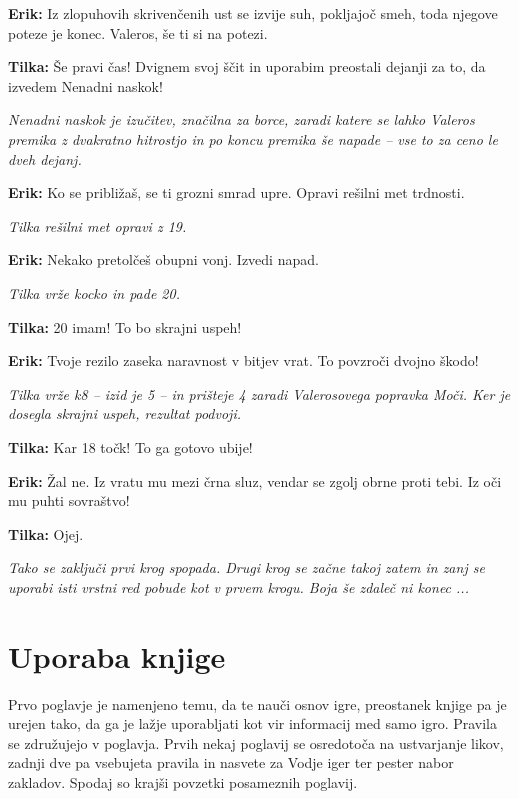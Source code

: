 \textbf{Erik:} Iz zlopuhovih skrivenčenih ust se izvije suh, pokljajoč smeh, toda njegove poteze je konec. Valeros, še ti si na potezi.

\textbf{Tilka:} Še pravi čas! Dvignem svoj ščit in uporabim preostali dejanji za to, da izvedem Nenadni naskok!

\vspace{20pt}
\textit{Nenadni naskok je izučitev, značilna za borce, zaradi katere se lahko Valeros premika z dvakratno hitrostjo in po koncu premika še napade -- vse to za ceno le dveh dejanj.}
\vspace{20pt}

\textbf{Erik:} Ko se približaš, se ti grozni smrad upre. Opravi rešilni met trdnosti.

\vspace{20pt}
\textit{Tilka rešilni met opravi z 19.}
\vspace{20pt}

\textbf{Erik:} Nekako pretolčeš obupni vonj. Izvedi napad.

\vspace{20pt}
\textit{Tilka vrže kocko in pade 20.}
\vspace{20pt}

\textbf{Tilka:} 20 imam! To bo skrajni uspeh!

\textbf{Erik:} Tvoje rezilo zaseka naravnost v bitjev vrat. To povzroči dvojno škodo!

\vspace{20pt}
\textit{Tilka vrže k8 -- izid je 5 -- in prišteje 4 zaradi Valerosovega popravka Moči. Ker je dosegla skrajni uspeh, rezultat podvoji.}
\vspace{20pt}

\textbf{Tilka:} Kar 18 točk! To ga gotovo ubije!

\textbf{Erik:} Žal ne. Iz vratu mu mezi črna sluz, vendar se zgolj obrne proti tebi. Iz oči mu puhti sovraštvo!

\textbf{Tilka:} Ojej.

\vspace{20pt}
\textit{Tako se zaključi prvi krog spopada. Drugi krog se začne takoj zatem in zanj se uporabi isti vrstni red pobude kot v prvem krogu. Boja še zdaleč ni konec ...}
\vspace{20pt}

\section{Uporaba knjige}
Prvo poglavje je namenjeno temu, da te nauči osnov igre, preostanek knjige pa je urejen tako, da ga je lažje uporabljati kot vir informacij med samo igro. Pravila se združujejo v poglavja. Prvih nekaj poglavij se osredotoča na ustvarjanje likov, zadnji dve pa vsebujeta pravila in nasvete za Vodje iger ter pester nabor zakladov. Spodaj so krajši povzetki posameznih poglavij.

